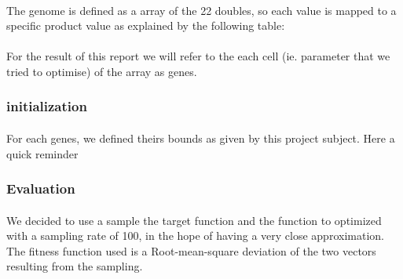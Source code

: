 \documentclass{article}
\begin{document}
      \paragraph{} %
      \label{par:}
        The genome is defined as a array of the 22 doubles, so each value is mapped to a
        specific product value as explained by the following table:
      
      
      \paragraph{} %
      \label{par:}
        For the result of this report we will refer to the each cell (ie. parameter that
        we tried to optimise) of the array as genes.
    
    \subsubsection{initialization} %
    \label{ssub:initialization}
      
      \paragraph{} %
      \label{par:}
        For each genes, we defined theirs bounds as given by this project subject.
        Here a quick reminder
      


    \subsubsection{Evaluation} %
    \label{ssub:Evaluation}
      
      \paragraph{} %
      \label{par:}
        We decided to use a sample the target function and the function to optimized
        with a sampling rate of 100, in the hope of having a very close approximation. 
        The fitness function used is a Root-mean-square deviation of the two vectors
        resulting from the sampling. 
\end{document}
